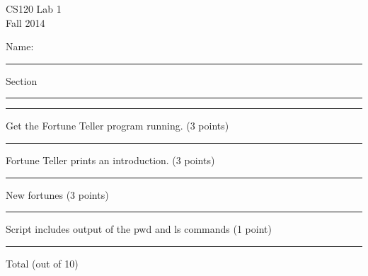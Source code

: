 \documentclass[12pt,openbib]{article}
\begin{document}
\thispagestyle{empty}
\vspace{-1.0in}
\large
\begin{center}
\textsf{CS120  Lab 1}\\
\textsf{Fall 2014}
\end{center}
\vspace{-0.2in}
\large\textsf{Name: }\rule[-0.01in]{2.5in}{0.015in}
\hspace{0.5in} Section \rule[-0.01in]{1.0in}{0.015in}

\normalsize
\rm
\vspace{0.5in}

 
\rule[-0.01in]{0.5in}{0.015in} Get the Fortune Teller program running. (3 points)

\rule[-0.01in]{0.5in}{0.015in} Fortune Teller prints an introduction. (3 points)

\rule[-0.01in]{0.5in}{0.015in} New fortunes (3 points)

\rule[-0.01in]{0.5in}{0.015in} Script includes output of the pwd and ls commands (1 point)

\rule[-0.01in]{0.5in}{0.015in} Total (out of 10)
\end{document}
